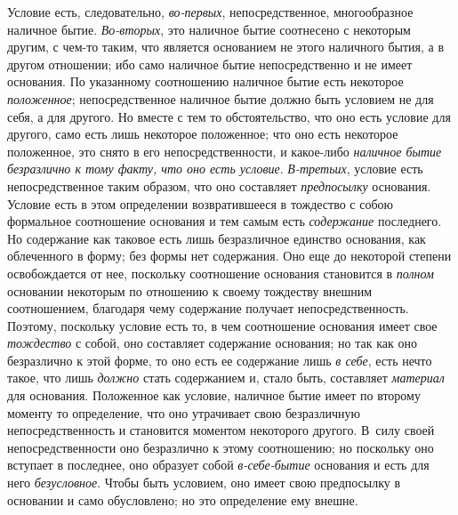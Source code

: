 Условие есть, следовательно, {\em во-первых},
непосредственное, многообразное наличное бытие.
{\em Во-вторых}, это наличное бытие соотнесено с
некоторым другим, с чем-то таким, что является основанием не этого
наличного бытия, а в другом отношении; ибо само наличное бытие
непосредственно и не имеет основания. По указанному соотношению наличное
бытие есть некоторое {\em положенное}; непосредственное
наличное бытие должно быть условием не для себя, а для другого. Но вместе с
тем то обстоятельство, что оно есть условие для другого, само есть лишь
некоторое положенное; что оно есть некоторое положенное, это снято в его
непосредственности, и какое-либо {\em наличное бытие
безразлично к тому факту, что оно есть условие}.
{\em В-третьих}, условие есть непосредственное таким
образом, что оно составляет {\em предпосылку}
основания. Условие есть в этом определении возвратившееся в тождество с
собою формальное соотношение основания и тем самым есть
{\em содержание} последнего. Но содержание как таковое
есть лишь безразличное единство основания, как облеченного в форму; без
формы нет содержания. Оно еще до некоторой степени освобождается от нее,
поскольку соотношение основания становится в
{\em полном} основании некоторым по отношению к своему
тождеству внешним соотношением, благодаря чему содержание получает
непосредственность. Поэтому, поскольку условие есть то, в чем соотношение
основания имеет свое {\em тождество} с собой, оно
составляет содержание основания; но так как оно безразлично к этой форме,
то оно есть ее содержание лишь {\em в себе}, есть нечто
такое, что лишь {\em должно} стать содержанием и, стало
быть, составляет {\em материал} для основания.
Положенное как условие, наличное бытие имеет по второму моменту то
определение, что оно утрачивает свою безразличную непосредственность и
становится моментом некоторого другого. В~силу своей непосредственности оно
безразлично к этому соотношению; но поскольку оно вступает в последнее, оно
образует собой {\em в-себе-бытие} основания и есть для
него {\em безусловное}. Чтобы быть условием, оно имеет
свою предпосылку в основании и само обусловлено; но это определение ему внешне.

